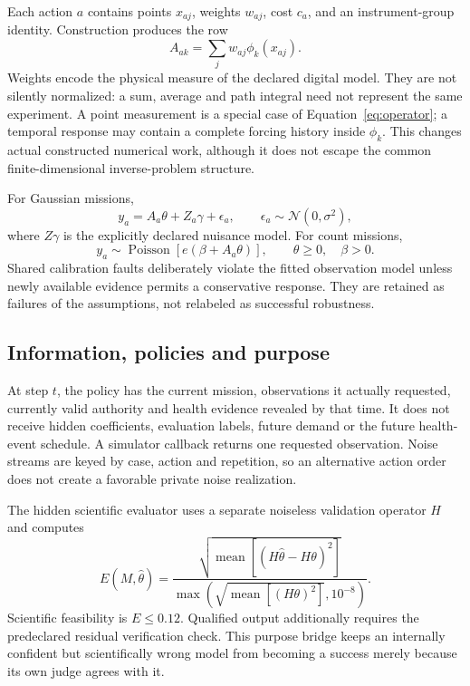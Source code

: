 \documentclass[11pt,letterpaper]{article}
\begin{document}
Each action $a$ contains points $x_{aj}$, weights $w_{aj}$, cost $c_a$, and an instrument-group identity. Construction produces the row
\begin{equation}
A_{ak}=\sum_j w_{aj}\phi_k(x_{aj}).\label{eq:operator}
\end{equation}
Weights encode the physical measure of the declared digital model. They are not silently normalized: a sum, average and path integral need not represent the same experiment. A point measurement is a special case of Equation~\eqref{eq:operator}; a temporal response may contain a complete forcing history inside $\phi_k$. This changes actual constructed numerical work, although it does not escape the common finite-dimensional inverse-problem structure.

For Gaussian missions,
\begin{equation}
y_a=A_a\theta+Z_a\gamma+\epsilon_a,
\qquad \epsilon_a\sim\mathcal N(0,\sigma^2),\label{eq:gaussian}
\end{equation}
where $Z\gamma$ is the explicitly declared nuisance model. For count missions,
\begin{equation}
y_a\sim\operatorname{Poisson}\!\left[e\left(\beta+A_a\theta\right)\right],
\qquad \theta\geq0,\quad\beta>0.\label{eq:poisson}
\end{equation}
Shared calibration faults deliberately violate the fitted observation model unless newly available evidence permits a conservative response. They are retained as failures of the assumptions, not relabeled as successful robustness.

\subsection{Information, policies and purpose}

At step $t$, the policy has the current mission, observations it actually requested, currently valid authority and health evidence revealed by that time. It does not receive hidden coefficients, evaluation labels, future demand or the future health-event schedule. A simulator callback returns one requested observation. Noise streams are keyed by case, action and repetition, so an alternative action order does not create a favorable private noise realization.

The hidden scientific evaluator uses a separate noiseless validation operator $H$ and computes
\begin{equation}
E(M,\widehat\theta)=
\frac{\sqrt{\operatorname{mean}\left[(H\widehat\theta-H\theta)^2\right]}}
{\max\left(\sqrt{\operatorname{mean}[(H\theta)^2]},10^{-8}\right)}.
\end{equation}
Scientific feasibility is $E\leq0.12$. Qualified output additionally requires the predeclared residual verification check. This purpose bridge keeps an internally confident but scientifically wrong model from becoming a success merely because its own judge agrees with it.
\end{document}
